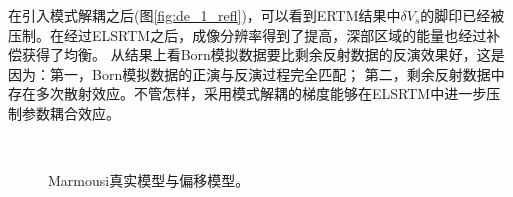 在引入模式解耦之后(图\ref{fig:de_1_refl})，可以看到ERTM结果中$\delta
V_s$的脚印已经被压制。在经过ELSRTM之后，成像分辨率得到了提高，深部区域的能量也经过补偿获得了均衡。
从结果上看Born模拟数据要比剩余反射数据的反演效果好，这是因为：第一，Born模拟数据的正演与反演过程完全匹配；
第二，剩余反射数据中存在多次散射效应。不管怎样，采用模式解耦的梯度能够在ELSRTM中进一步压制参数耦合效应。
\begin{figure}[!hbt]
   \centering
   \\
   \caption{Marmousi真实模型与偏移模型。}
   \label{fig:TrueAndInitial_2}
\end{figure}

